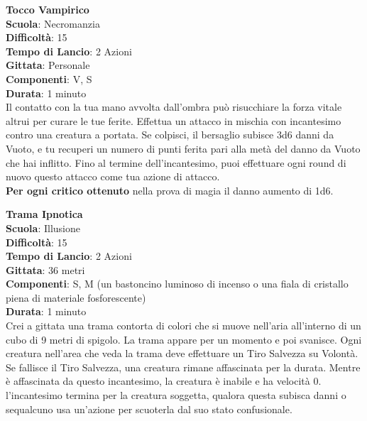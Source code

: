 \begin{multicols}{2}
\medskip\textbf{Tocco Vampirico}\\
\textbf{Scuola}: Necromanzia\\
\textbf{Difficoltà}:  15\\
\textbf{Tempo di Lancio}: 2 Azioni\\
\textbf{Gittata}: Personale\\
\textbf{Componenti}: V, S\\
\textbf{Durata}: 1 minuto \\
Il contatto con la tua mano avvolta dall'ombra può risucchiare la forza vitale altrui per curare le tue ferite. Effettua un attacco in mischia con incantesimo contro una creatura a portata. Se colpisci, il bersaglio subisce 3d6 danni da Vuoto, e tu recuperi un numero di punti ferita pari alla metà del danno da Vuoto che hai inflitto. Fino al termine dell'incantesimo, puoi effettuare ogni round di nuovo questo attacco come tua azione di attacco.\\
\textbf{Per ogni critico ottenuto} nella prova di magia il danno aumento di 1d6.

\medskip\textbf{Trama Ipnotica}\\
\textbf{Scuola}: Illusione\\
\textbf{Difficoltà}:  15\\
\textbf{Tempo di Lancio}: 2 Azioni\\
\textbf{Gittata}: 36 metri\\
\textbf{Componenti}: S, M (un bastoncino luminoso di incenso o una fiala di cristallo piena di materiale fosforescente)\\
\textbf{Durata}: 1 minuto\\
Crei a gittata una trama contorta di colori che si muove nell'aria all'interno di un cubo di 9 metri di spigolo. La trama appare per un momento e poi svanisce. Ogni creatura nell'area che veda la trama deve effettuare un Tiro Salvezza su Volontà. Se fallisce il Tiro Salvezza, una creatura rimane affascinata per la durata. Mentre è affascinata da questo incantesimo, la creatura è inabile e ha velocità 0. l'incantesimo termina per la creatura soggetta, qualora questa subisca danni o sequalcuno usa un'azione per scuoterla dal suo stato confusionale.


\end{multicols}
